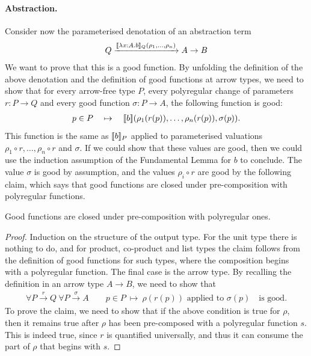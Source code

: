 \paragraph*{Abstraction.} Consider now the parameterised denotation of an abstraction term 
\begin{align*}
Q \xrightarrow{[\![\lambda x : A.b]\!]_{Q} (\rho_1,\ldots,\rho_n)}{A \to B}
\end{align*}
We want to prove that this is a good function. 
By unfolding the definition of the above denotation and the definition of good functions at arrow types, we need to show that for every arrow-free type $P$, every polyregular change of parameters $r : P \to Q$ and every good function $\sigma : P \rightarrow  A$, the following function is good:
\begin{align*}
p \in P \quad \mapsto \quad [\![b]\!] (\rho_1(r(p)),\ldots,\rho_n(r(p)), \sigma(p)).
\end{align*}
This function is the same as $[\![b]\!]_{P}$ applied to parameterised valuations $\rho_1 \circ r, \ldots, \rho_n \circ r$ and $\sigma$. If we could show that these values are good, then we could use the induction assumption of the Fundamental Lemma for $b$ to conclude. The value $\sigma$ is good by assumption, and the values $\rho_i \circ r$ are good by the following claim, which says that good functions are closed under pre-composition with polyregular functions.
\begin{claim}\label{claim:logical-relations-closed-under-precomposition}
    Good functions are closed under pre-composition with polyregular ones.
\end{claim}
\begin{proof}
    Induction on the structure of the output type. For the unit type there is nothing to do, and for product, co-product and list types the claim follows from the definition of good functions for such types, where the composition begins with a polyregular function. The final case is the arrow type. By recalling the definition in an arrow type $A \to B$, we need to show that 
    \begin{align*}
        \forall P \xrightarrow r Q \ \forall P \xrightarrow \sigma A \qquad
            p \in P \ \mapsto \  \rho(r(p)) \text{ applied to } \sigma(p) \quad \text{is good}.
        \end{align*}
    To prove the claim, we need to show that if the above condition is true for $\rho$, then it remains true after $\rho$ has been pre-composed with a polyregular function $s$. This is indeed true, since $r$ is quantified universally, and thus it can consume the part of $\rho$ that begins with $s$. 
\end{proof}


